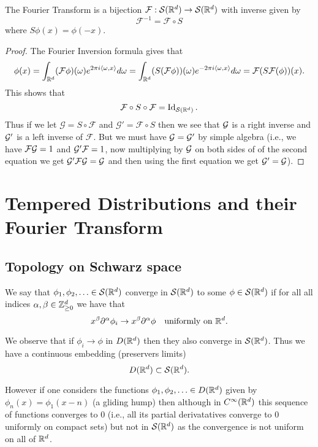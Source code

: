 \documentclass[twoside, a4paper, 10pt]{amsart}
\begin{document}
\begin{corol} The Fourier Transform is a bijection $\mathcal{F}:\mathcal{S}(\mathbb{R}^d) \to \mathcal{S}(\mathbb{R}^d)$ with inverse given by $$\mathcal{F}^{-1} = \mathcal{F} \circ S$$ where $S\phi (x) = \phi(-x)$.

\end{corol}

\begin{proof} The Fourier Inversion formula gives that $$\phi(x) = \int_{\mathbb{R}^d} (\mathcal{F}\phi) (\omega) e^{2\pi  i \langle \omega, x \rangle} d\omega = \int_{\mathbb{R}^d} (S(\mathcal{F}\phi))(\omega) e^{-2\pi i \langle\omega, x \rangle} d \omega = \mathcal{F}(S\mathcal{F}(\phi))(x).$$ This shows that $$\mathcal{F} \circ S \circ \mathcal{F} = \operatorname{Id}_{\mathcal{S}(\mathbb{R}^d)}.$$ Thus if we let $\mathcal{G} = S \circ \mathcal{F}$ and $\mathcal{G}' = \mathcal{F} \circ S$ then we see that $\mathcal{G}$ is a right inverse and $\mathcal{G}'$ is a left inverse of $\mathcal{F}$. But we must have $\mathcal{G} = \mathcal{G}'$ by simple algebra (i.e., we have $\mathcal{F} \mathcal{G} = 1$ and $\mathcal{G}' \mathcal{F} = 1$, now multiplying by $\mathcal{G}$ on both sides of of the second equation we get $\mathcal{G}' \mathcal{F} \mathcal{G} = \mathcal{G}$ and then using the first equation we get $\mathcal{G}' = \mathcal{G}$). \end{proof}

\section{Tempered Distributions and their Fourier Transform}

\subsection{Topology on Schwarz space}

\begin{mydef} We say that $\phi_1, \phi_2, \ldots \in \mathcal{S}(\mathbb{R}^d)$ converge in $\mathcal{S}(\mathbb{R}^d)$ to some $\phi \in \mathcal{S}(\mathbb{R}^d)$ if for all all indices $\alpha, \beta \in \mathbb{Z}_{\geq 0}^d$ we have that $$x^{\beta}\partial^{\alpha}\phi_i \to x^{\beta}\partial^{\alpha}\phi \quad \text{uniformly on } \mathbb{R}^d.$$

\end{mydef}

We observe that if $\phi_i \to \phi$ in $D(\mathbb{R}^d)$ then they also converge in $\mathcal{S}(\mathbb{R}^d)$.  Thus we have a continuous embedding (preservers limits) $$D(\mathbb{R}^d) \subset \mathcal{S}(\mathbb{R}^d).$$

However if one considers the functions $\phi_1, \phi_2, \ldots \in D(\mathbb{R}^d)$ given by $\phi_n (x) =\phi_1 (x-n)$ (a gliding hump) then although in $C^{\infty}(\mathbb{R}^d)$ this sequence of functions converges to $0$ (i.e., all its partial derivatatives converge to $0$ uniformly on compact sets) but not in $\mathcal{S}(\mathbb{R}^d)$ as the convergence is not uniform on all of $\mathbb{R}^d$.
\end{document}
